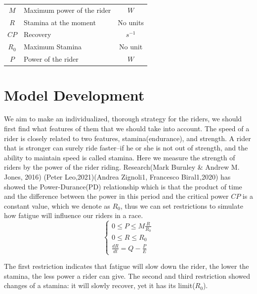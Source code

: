 \documentclass[12pt]{article}
\begin{document}
\begin{center}
{\begin{tabular}{clc}
            $M$           & Maximum  power of the rider                             & \quad $W$         \\[0.25cm]
            $R$           & Stamina at the moment                                   & \quad No units    \\[0.25cm]
            $CP$          & Recovery                                                & \quad $s^{-1}$    \\[0.25cm]
            $R_0$         & Maximum Stamina                                         & \quad No unit     \\[0.25cm]
            $P$           & Power of the rider                                      & \quad $W$         \\[0.25cm]
        \end{tabular}
    }
\end{center}
\section{Model Development}
We aim to make an individualized, thorough strategy for the riders, we should first find what features of them that we should take into account.
The speed of a rider
is closely related to two features, stamina(endurance), and strength. A rider that is stronger can surely ride faster--if he or she is not out of strength, and the ability
to maintain speed is called stamina.
Here we measure the strength of riders by the power of the rider riding. Research(Mark Burnley \& Andrew M. Jones, 2016)\cite{doi:10.1080/17461391.2016.1249524}
(Peter Leo,2021)\cite{leo2021power}(Andrea Zignoli1, Francesco Biral1,2020)\cite{zignoli2020prediction}
has showed the Power-Durance(PD) relationship
which is that the product of time and the difference between the power in this period and the critical power $CP$ is a constant value, which we
denote as $R_0$,  thus we can  set restrictions  to simulate how fatigue will influence our riders in a race.
\begin{equation}
    \left\{
    \begin{array}{c}
        0                \leqslant  P  \leqslant  M\frac{R}{R_0} \\
        0                \leqslant  R  \leqslant  R_0            \\
        \frac{d R}{d t}  =          Q  -          \frac{P}{E}
    \end{array}
    \right.
\end{equation}

The first restriction indicates that fatigue will slow down the rider, the lower the stamina, the less power a rider can give. The second and third restriction
showed changes of a stamina: it will slowly recover, yet it has its limit($R_0$).
\end{document}
